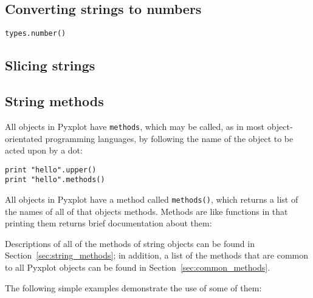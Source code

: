 \vspace{3mm}

\vspace{3mm}

\subsection{Converting strings to numbers}

{\tt types.number()}

\subsection{Slicing strings}



\subsection{String methods}

All objects in Pyxplot have {\tt methods}, which may be called, as in most object-orientated programming languages, by following the name of the object to be acted upon by a dot:

\begin{verbatim}
print "hello".upper()
print "hello".methods()
\end{verbatim}

\noindent All objects in Pyxplot have a method called {\tt methods()}, which returns a list of the names of all of that objects methods. Methods are like functions in that printing them returns brief documentation about them:

\vspace{3mm}

\vspace{3mm}

\noindent Descriptions of all of the methods of string objects can be found in Section~\ref{sec:string_methods}; in addition, a list of the methods that are common to all Pyxplot objects can be found in Section~\ref{sec:common_methods}.

The following simple examples demonstrate the use of some of them:

\vspace{3mm}

\vspace{3mm}

\vspace{3mm}

\vspace{3mm}

